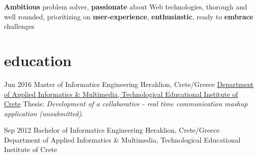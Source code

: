 \vspace{-0.1cm}
{\textbf{Ambitious} problem solver, \textbf{passionate} about Web technologies, thorough and well rounded, prioritizing on \textbf{user-experience}, \textbf{enthusiastic}, ready to \textbf{embrace} challenges}

\vspace{-0.3cm}
\section{\normalfont education}
\vspace{-0.1cm}
\begin{entrylist}
\entry
{Jun 2016}
{Master {\normalfont of Informatics Engineering}}
{Heraklion, Crete/Greece}
{\href{https://www.teicrete.gr/}{Department of Applied Informatics \& Multimedia, Technological Educational Institute of Crete}}
Thesis: \emph{Development of a collaborative - real time communication mashup application (unsubmitted)}.\\
\vspace{-.5cm}

\entry
{Sep 2012}
{Bachelor {\normalfont of Informatics Engineering}}
{Heraklion, Crete/Greece}
Department of Applied Informatics \& Multimedia, Technological Educational Institute of Crete
\end{entrylist}

\vspace{-.3cm}

